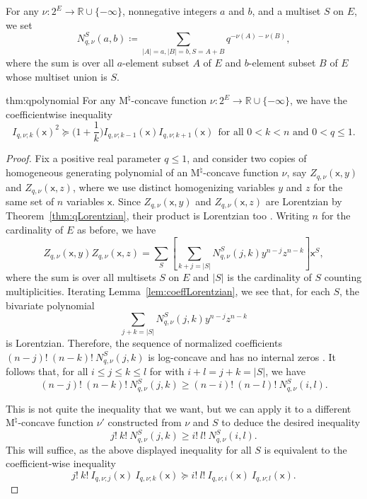 \documentclass{amsart}
\theoremstyle{definition}
\theoremstyle{remark}
\newcommand{\abs}[1]{\left|#1\right|}               %
\newcommand{\R}{\mathbb{R}}
\newcommand{\x}{\mathsf{x}}    %
\newcommand{\1}{\mathbf{1}}
\newcommand{\Mnat}{$\text{M}^\natural$}
\numberwithin{equation}{section}
\begin{document}
For any $\nu\colon 2^{E}\to \R \cup \{-\infty\}$, nonnegative integers $a$ and $b$, and a multiset $S$ on $E$, we set
 \[
 N^{S}_{q,\nu}(a,b)  \coloneqq  \sum_{|A|=a,|B|=b, S=A+B} q^{-\nu(A)-\nu(B)},
 \]
 where the sum is over all $a$-element subset $A$ of $E$ and $b$-element subset $B$ of $E$ whose multiset union is $S$.

\begin{reptheorem}{thm:qpolynomial}
For any \Mnat-concave function $\nu:2^E \to \mathbb{R} \cup \{-\infty\}$, we have the coefficientwise inequality
  \[
  I_{q,\nu;k}(\x)^2 \succeq \Big(1+\frac1k\Big)I_{q,\nu;k-1}(\x) I_{q,\nu;k+1}(\x)
   \ \ \text{for  all $0<k<n$ and $0<q\leq 1$.}
  \]
\end{reptheorem}


\begin{proof}
Fix a positive real parameter $q \le 1$, and consider two copies of homogeneous generating polynomial  of an \Mnat-concave function $\nu$, say $Z_{q,\nu}(\x,y)$ and $Z_{q,\nu}(\x,z)$, where we use distinct homogenizing variables $y$ and $z$ for the same set of $n$ variables $\x$.
Since $Z_{q,\nu}(\x,y)$ and $Z_{q,\nu}(\x,z)$ are Lorentzian  by Theorem~\ref{thm:qLorentzian}, their product is Lorentzian too \cite[Corollary 2.32]{BH20}.
Writing $n$ for the cardinality of $E$ as before, we have
  \[
  Z_{q,\nu}(\x,y)Z_{q,\nu}(\x,z) = \sum\limits_{S} \left[\sum_{k+j=\abs{S}} N^S_{q,\nu}(j,k) y^{n-j}z^{n-k} \right] \x^S,
  \]
  where the sum is over all multisets $S$ on $E$ and $|S|$ is the cardinality of $S$ counting multiplicities. Iterating Lemma~\ref{lem:coeffLorentzian}, we see that, for each $S$, the bivariate polynomial
  \[
  \sum_{j+k=\abs{S}} N^S_{q,\nu}(j,k) y^{n-j}z^{n-k} 
  \]
  is Lorentzian.
  Therefore, the sequence of normalized coefficients $(n-j)! \ (n-k)! \ N^S_{q,\nu}(j,k)$ is log-concave and has no internal zeros \cite[Example 2.3]{BH20}. It follows that,  for all $i\leq j\leq k\leq l$ for with  $i+l=j+k=\abs{S}$, we have
  \begin{equation}\label{eq:lc4acoeff}
     (n-j)!\ (n-k)!\ N^S_{q,\nu}(j,k)  \ge (n-i)!\ (n-l)!\ N^S_{q,\nu}(i,l).
\end{equation}
  
This is not quite the inequality that we want, but we can apply it to a different  
 \Mnat-concave function $\nu'$ constructed from $\nu$ and $S$ to deduce the desired inequality
\[
j!\ k!\ N^S_{q,\nu}(j,k) \ge i!\ l!\ N^S_{q,\nu}(i,l).
\]
This will suffice, as the above displayed inequality for all $S$ is equivalent to the coefficient-wise inequality
\[
      j!\ k!\ I_{q,\nu;j}(\x)\ I_{q,\nu;k}(\x) \succeq
    i!\ l!\ I_{q,\nu;i}(\x)\ I_{q,\nu;l}(\x).
  \]


\end{proof}
\end{document}
